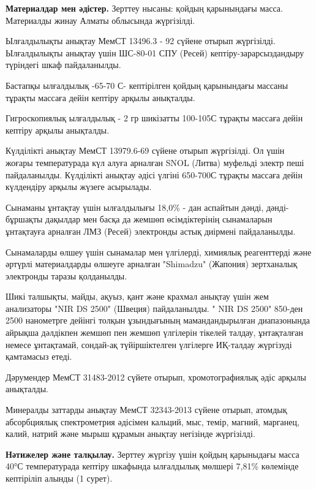 {\bfseries Материалдар мен әдістер.} Зерттеу нысаны: қойдың қарынындағы
масса. Материалды жинау Алматы облысында жүргізілді.

Ылғалдылықты анықтау МемСТ 13496.3 - 92 сүйене отырып жүргізілді.
Ылғалдылықты анықтау үшін ШС-80-01 СПУ (Ресей) кептіру-зарарсыздандыру
түріндегі шкаф пайдаланылды.

Бастапқы ылғалдылық -65-70 С- кептірілген қойдың
қарынындағы массаны тұрақты массаға дейін кептіру арқылы анықталды.

Гигроскопиялық ылғалдылық - 2 гр шикізатты 100-105С
тұрақты массаға дейін кептіру арқылы анықталды.

Күлділікті анықтау МемСТ 13979.6-69 сүйене отырып жүргізілді. Ол үшін
жоғары температурада күл алуға арналған SNOL (Литва) муфельді электр
пеші пайдаланылды. Күлділікті анықтау әдісі үлгіні
650-700С тұрақты массаға дейін күлдендіру арқылы
жүзеге асырылады.

Сынаманы ұнтақтау үшін ылғалдылығы 18,0\% - дан аспайтын дәнді,
дәнді-бұршақты дақылдар мен басқа да жемшөп өсімдіктерінің сынамаларын
ұнтақтауға арналған ЛМЗ (Ресей) электронды астық диірмені пайдаланылды.

Сынамаларды өлшеу үшін сынамалар мен үлгілерді, химиялық реагенттерді
және әртүрлі материалдарды өлшеуге арналған "Shimadzu" (Жапония)
зертханалық электронды таразы қолданылды.

Шикі талшықты, майды, ақуыз, қант және крахмал анықтау үшін жем
анализаторы "NIR DS 2500" (Швеция) пайдаланылды. " NIR DS 2500" 850-ден
2500 нанометрге дейінгі толқын ұзындығының мамандандырылған диапазонында
айрықша дәлдікпен жемшөп пен жемшөп үлгілерін тікелей талдау,
ұнтақталған немесе ұнтақтамай, сондай-ақ түйіршіктелген үлгілерге
ИҚ-талдау жүргізуді қамтамасыз етеді.

Дәрумендер МемСТ 31483-2012 сүйете отырып, хромотографиялық әдіс арқылы
анықталды.

Минералды заттарды анықтау МемСТ 32343-2013 сүйене отырып, атомдық
абсорбциялық спектрометрия әдісімен кальций, мыс, темір, магний,
марганец, калий, натрий және мырыш құрамын анықтау негізінде жүргізілді.

{\bfseries Нәтижелер және талқылау.} Зерттеу жүргізу үшін қойдың қарыныдағы
масса 40°С температурада кептіру шкафында ылғалдылық мөлшері 7,81\%
көлемінде кептіріліп алынды (1 сурет).



